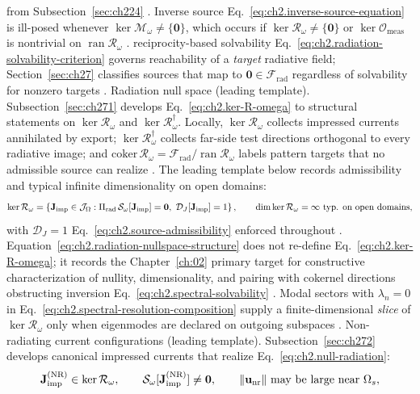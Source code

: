 from Subsection~\ref{sec:ch224} \cite{stratton1941}. Inverse source Eq.~\eqref{eq:ch2.inverse-source-equation}
is ill-posed whenever \(\ker\mathcal{M}_\omega\neq\{\mathbf{0}\}\), which occurs if
\(\ker\mathcal{R}_\omega\neq\{\mathbf{0}\}\) or \(\ker\mathcal{O}_{\mathrm{meas}}\) is
nontrivial on \(\operatorname{ran}\mathcal{R}_\omega\) \cite{harrington2001}.
reciprocity-based solvability Eq.~\eqref{eq:ch2.radiation-solvability-criterion} governs reachability
of a \emph{target} radiative field; Section~\ref{sec:ch27} classifies sources that map to
\(\mathbf{0}\in\mathcal{F}_{\mathrm{rad}}\) regardless of solvability for nonzero targets
\cite{stratton1941}.
Radiation null space (leading template). Subsection~\ref{sec:ch271} develops Eq.~\eqref{eq:ch2.ker-R-omega} to
structural statements on \(\ker\mathcal{R}_\omega\) and \(\ker\mathcal{R}_\omega^{\dagger}\).
Locally, \(\ker\mathcal{R}_\omega\) collects impressed currents annihilated by export;
\(\ker\mathcal{R}_\omega^{\dagger}\) collects far-side test directions orthogonal to every
radiative image; and \(\mathrm{coker}\,\mathcal{R}_\omega=\mathcal{F}_{\mathrm{rad}}/\operatorname{ran}\mathcal{R}_\omega\)
labels pattern targets that no admissible source can realize \cite{stratton1941}. The leading template
below records admissibility and typical infinite dimensionality on open domains:
\begin{equation}
\label{eq:ch2.radiation-nullspace-structure}
\ker\mathcal{R}_\omega
=
\left\{
\mathbf{J}_{\mathrm{imp}}\in\mathcal{J}_\Omega:
\Pi_{\mathrm{rad}}\,\mathcal{S}_\omega[\mathbf{J}_{\mathrm{imp}}]=\mathbf{0},
\ \mathcal{D}_{J}[\mathbf{J}_{\mathrm{imp}}]=1
\right\},
\qquad
\dim\ker\mathcal{R}_\omega=\infty\ \text{typ. on open domains},
\end{equation}
with $\mathcal{D}_J=1$ Eq.~\eqref{eq:ch2.source-admissibility} enforced throughout
\cite{stratton1941}. Equation~\eqref{eq:ch2.radiation-nullspace-structure}
does not re-define Eq.~\eqref{eq:ch2.ker-R-omega}; it records the Chapter~\ref{ch:02}
primary target for constructive characterization of nullity, dimensionality, and pairing with cokernel
directions obstructing inversion Eq.~\eqref{eq:ch2.spectral-solvability}
\cite{stratton1941}. Modal sectors with \(\lambda_n=0\) in
Eq.~\eqref{eq:ch2.spectral-resolution-composition} supply a finite-dimensional \emph{slice}
of \(\ker\mathcal{R}_\omega\) only when eigenmodes are declared on outgoing subspaces
\cite{harrington2001}.
Non-radiating current configurations (leading template). Subsection~\ref{sec:ch272} develops canonical impressed currents that realize
Eq.~\eqref{eq:ch2.null-radiation}:
\begin{equation}
\label{eq:ch2.nr-current-template}
\Jimp^{\mathrm{(NR)}}\in\ker\mathcal{R}_\omega,
\qquad
\mathcal{S}_\omega[\Jimp^{\mathrm{(NR)}}]\neq\mathbf{0},
\qquad
\|\mathbf{u}_{\mathrm{nr}}\|\ \text{may be large near}\ \Omega_s,
\end{equation}
